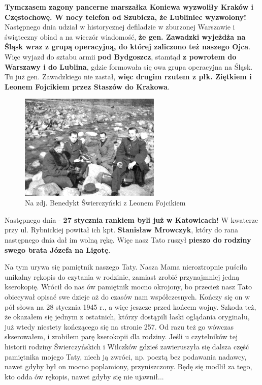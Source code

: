 \textbf{Tymczasem zagony pancerne marszałka Koniewa wyzwoliły Kraków i Częstochowę. W nocy telefon od Szubicza, że Lubliniec wyzwolony!} Następnego dnia udział w historycznej defiladzie w zburzonej Warszawie i świąteczny obiad a na wieczór wiadomość, \textbf{że gen. Zawadzki wyjeżdża na Śląsk wraz z grupą operacyjną, do której zaliczono też naszego Ojca}. Więc wyjazd do sztabu armii \textbf{pod Bydgoszcz}, stamtąd \textbf{z powrotem do Warszawy i do Lublina}, gdzie formowała się owa grupa operacyjna na Śląsk. Tu już gen. Zawadzkiego nie zastał, \textbf{więc drugim rzutem z płk. Ziętkiem i Leonem Fojcikiem przez Staszów do Krakowa}. 

\begin{figure}[!h]
\begin{center}
\includegraphics[width=0.6\textwidth]{photo/benedykt_swierczynski_leon_fojcik.jpg}
\caption[Benedykt Świerczyński z Leonem Fojcikiem]{Na zdj. Benedykt Świerczyński z Leonem Fojcikiem}
\end{center}
\end{figure}

Następnego dnia - \textbf{27 stycznia rankiem byli już w Katowicach!} W kwaterze przy ul. Rybnickiej powitał ich kpt. \textbf{Stanisław Mrowczyk}, który do rana następnego dnia dał im wolną rękę. Więc nasz Tato ruszył \textbf{pieszo do rodziny swego brata Józefa na Ligotę}.

Na tym urywa się pamiętnik naszego Taty. Nasza Mama nieroztropnie puściła unikalny rękopis do czytania w rodzinie, zamiast zrobić przynajmniej jedną kserokopię. Wrócił do nas ów pamiętnik mocno okrojony, bo przecież nasz Tato obiecywał opisać swe dzieje aż do czasów nam współczesnych. Kończy się on w pół słowa na 28 stycznia 1945 r., a więc jeszcze przed końcem wojny. Szkoda też, że okazałem się jednym z ostatnich, którzy dostąpili łaski oglądania oryginału, już wtedy niestety kończącego się na stronie 257. Od razu też go wówczas skserowałem, i zrobiłem parę kserokopii dla rodziny. Jeśli u czytelników tej historii rodziny Świerczyńskich i Wilczków gdzieś zawieruszyła się dalsza część pamiętnika mojego Taty, niech ją zwróci, np. pocztą bez podawania nadawcy, nawet gdyby był on mocno poplamiony, przyniszczony. Będę się modlił za tego, kto odda ów rękopis, nawet gdyby się nie ujawnił...

